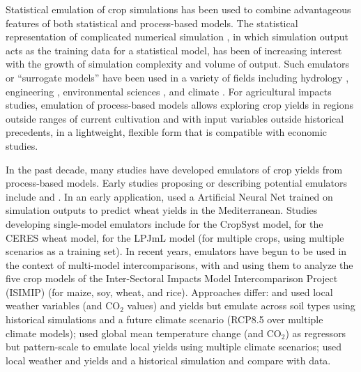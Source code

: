 \documentclass[preprint, 5p, times, twocolumn]{elsarticle}
\begin{document}
Statistical emulation of crop simulations has been used to combine advantageous features of both statistical and process-based models. The statistical representation of complicated numerical simulation \citep[e.g.][]{OHAGAN2006, OHAGAN2010}, in which simulation output acts as the training data for a statistical model, has been of increasing interest with the growth of simulation complexity and volume of output. Such emulators or ``surrogate models'' have been used in a variety of fields including hydrology \citep[e.g.][]{Razavi2012}, engineering \citep[e.g.][]{STORLIE2009}, environmental sciences \citep[e.g.][]{RATTO2012}, and climate \citep[e.g.][]{Castruccio14, Holden2014}. For agricultural impacts studies, emulation of process-based models allows exploring crop yields in regions outside ranges of current cultivation and with input variables outside historical precedents, in a lightweight, flexible form that is compatible with economic studies. 

In the past decade, many studies have developed emulators of crop yields from process-based models. Early studies proposing or describing potential emulators include \citet{Howden2005, raisen2006} and \citet{Lobell2010}. In an early application, \citet{Ferrise2011} used a Artificial Neural Net trained on simulation outputs to predict wheat yields in the Mediterranean. Studies developing single-model emulators include  \citet{Holzkamper2012} for the CropSyst model, \citet{RUANE2013a} for the CERES wheat model, \citet{Oyebamiji15} for the LPJmL model (for multiple crops, using multiple scenarios as a training set). In recent years, emulators have begun to be used in the context of multi-model intercomparisons, with \citet{BLANC2015, BLANC2017, Ostberg2018} and \citet{Mistry2017} using them to analyze the five crop models of the Inter-Sectoral Impacts Model Intercomparison Project (ISIMIP) \citep{Warszawski3228} (for maize, soy, wheat, and rice). Approaches differ: \citet{BLANC2015} and \citet{BLANC2017} used local weather variables (and CO$_2$ values) and yields but emulate across soil types using historical simulations and a future climate scenario (RCP8.5 over multiple climate models); \citet{Ostberg2018} used global mean temperature change (and CO$_2$) as regressors but pattern-scale to emulate local yields using multiple climate scenarios; \citet{Mistry2017} used local weather and yields and a historical simulation and compare with data. 
\end{document}

